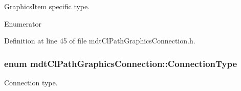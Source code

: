 Graphics\-Item specific type. 

\begin{Desc}
\item[Enumerator]\par
\begin{description}
\item[{\em 
\hypertarget{classmdt_cl_path_graphics_connection_a44e9a0adc0eeb58723d564c163accd2fa9843d7f20edcdad949a8e3611ca47625}{Type}\label{classmdt_cl_path_graphics_connection_a44e9a0adc0eeb58723d564c163accd2fa9843d7f20edcdad949a8e3611ca47625}
}]\end{description}
\end{Desc}


Definition at line 45 of file mdt\-Cl\-Path\-Graphics\-Connection.\-h.

\hypertarget{classmdt_cl_path_graphics_connection_af26f48d07af6395c5395d8078facb3a5}{
\subsubsection[{Connection\-Type}]{\setlength{\rightskip}{0pt plus 5cm}enum {\bf mdt\-Cl\-Path\-Graphics\-Connection\-::\-Connection\-Type}}}\label{classmdt_cl_path_graphics_connection_af26f48d07af6395c5395d8078facb3a5}


Connection type. 


